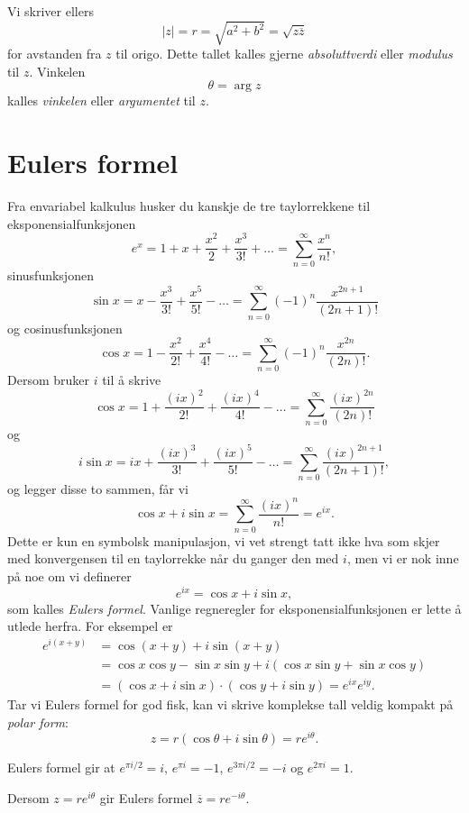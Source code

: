  Vi skriver ellers
 \[|z|=r=\sqrt{a^2+b^2}=\sqrt{z\overline z}\]
 for avstanden fra $z$ til origo. 
 Dette tallet kalles gjerne \emph{absoluttverdi} eller \emph{modulus} til $z$. 
 Vinkelen 
 \[
 \theta= \arg z
 \] 
 kalles \emph{vinkelen} eller \emph{argumentet} til $z$.


\section*{Eulers formel}
Fra envariabel kalkulus husker du kanskje de tre taylorrekkene til eksponensialfunksjonen
\[
e^{x}=1+x+\frac{x^{2}}{2}+\frac{x^{3}}{3!}+\dots=\sum_{n=0}^{\infty}\frac{x^{n}}{n!}, 
\]
sinusfunksjonen
\[
\sin{x}=x-\frac{x^{3}}{3!}+\frac{x^{5}}{5!}-\dots=\sum_{n=0}^{\infty}(-1)^{n}\frac{x^{2n+1}}{(2n+1)!} 
\]
og cosinusfunksjonen
\[
\cos{x}=1-\frac{x^{2}}{2!}+\frac{x^{4}}{4!}-\dots=\sum_{n=0}^{\infty}(-1)^{n}\frac{x^{2n}}{(2n)!}.
\]
Dersom bruker $i$ til å skrive
\[
\cos{x}=1+\frac{(ix)^{2}}{2!}+\frac{(ix)^{4}}{4!}-\dots=\sum_{n=0}^{\infty}\frac{(ix)^{2n}}{(2n)!}
\]
og 
\[
i\sin{x}=ix+\frac{(ix)^{3}}{3!}+\frac{(ix)^{5}}{5!}-\dots=\sum_{n=0}^{\infty}\frac{(ix)^{2n+1}}{(2n+1)!},
\]
og legger disse to sammen, får vi 
\[
\cos x + i\sin x=\sum_{n=0}^{\infty}\frac{(ix)^{n}}{n!}=e^{ix}.
\]
Dette er kun en symbolsk manipulasjon, 
vi vet strengt tatt ikke hva som skjer med konvergensen til en taylorrekke når du ganger den med $i$, 
men vi er nok inne på noe om vi definerer
\[
e^{ix}=\cos x + i\sin x,
\]
som kalles \emph{Eulers formel}. 
Vanlige regneregler for eksponensialfunksjonen er lette å utlede herfra. For eksempel er 
\begin{align*}
e^{i(x+y)}  &= \cos (x+y) + i\sin (x+y) \\[5pt] &= \cos x \cos y - \sin x \sin y + i (\cos x \sin y + \sin x \cos y) \\[5pt] &= 
(\cos x+ i \sin x) \cdot (\cos y+ i \sin y) = e^{ix}e^{iy}.
\end{align*}
Tar vi Eulers formel for god fisk, kan vi skrive komplekse tall veldig kompakt på \emph{polar form}:
\[
z=r(\cos \theta+i\sin \theta)=re^{i\theta}.
\]

\begin{ex}
Eulers formel gir at $e^{ \pi i/2 }=i$, $e^{\pi i}=-1$, $e^{3\pi i/2 }=-i$ og $e^{2 \pi i}=1$.
\end{ex}

\begin{ex}
Dersom $z=re^{i\theta}$ gir Eulers formel $\overline z=re^{-i\theta}$.
\end{ex}

